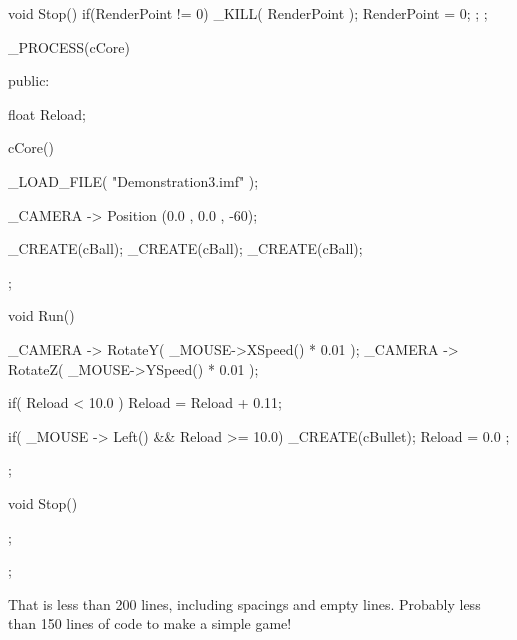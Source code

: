 \begin{DoxyCode}
{   void Stop()
   {
                if(RenderPoint != 0)
                {
                        _KILL( RenderPoint );
                        RenderPoint = 0;
                }
   };
};


_PROCESS(cCore)
{
public:

        float Reload;

        cCore()
        {
         _LOAD_FILE( "Demonstration3.imf" );

        _CAMERA -> Position (0.0 , 0.0 , -60);


    _CREATE(cBall);
        _CREATE(cBall);
        _CREATE(cBall);

        };

        void Run()
        {
                _CAMERA -> RotateY( _MOUSE->XSpeed() * 0.01 );
                _CAMERA -> RotateZ( _MOUSE->YSpeed() * 0.01 );

                if( Reload < 10.0 ) { Reload = Reload + 0.11; }

                if( _MOUSE -> Left() && Reload >= 10.0)
                {
                        _CREATE(cBullet);
                        Reload = 0.0 ;
                }
        };

        void Stop()
        {

        };

 };
\end{DoxyCode}
 That is less than 200 lines, including spacings and empty lines. Probably less than 150 lines of code to make a simple game! 